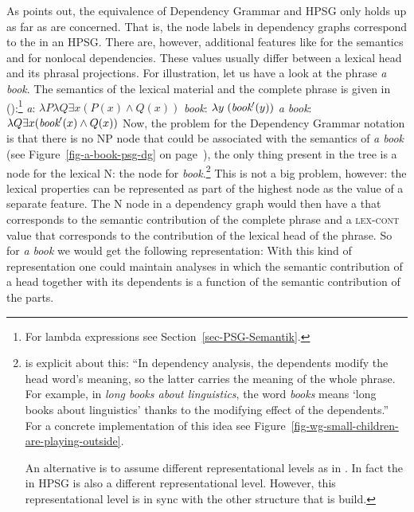 As \citet{Oliva2003a} points out, the equivalence of Dependency Grammar and HPSG only holds up as far
as \headvs are concerned.
That is, the node labels in dependency graphs correspond to the \headvs in
an HPSG. There are, however, additional features like \cont for the semantics and \slasch for
nonlocal dependencies. These values usually differ between a lexical head and its phrasal
projections. For illustration, let us have a look at the phrase \emph{a book}. The semantics of the
lexical material and the complete phrase is given in ():\footnote{%
  For lambda expressions see Section~\ref{sec-PSG-Semantik}.
}
\eal
\ex \emph{a}: $\lambda P \lambda Q \exists x (P(x) \wedge Q(x))$
\ex \emph{book}: $\lambda y\;(\textit{book}'(y))$
\ex \emph{a book}: $\lambda Q \exists x (\textit{book}'(x) \wedge Q(x))$
\zl
Now, the problem for the Dependency Grammar notation is that there is no NP node that could be
associated with the semantics of \emph{a book} (see Figure~\ref{fig-a-book-psg-dg} on page~\pageref{fig-a-book-psg-dg}), the only thing present in the tree is a node for the
lexical N: the node for \emph{book}.\footnote{%
  \citet[--392]{Hudson2003a}\indexwg is explicit about this: ``In dependency analysis, the dependents modify the head
    word's meaning, so the latter carries the meaning of the whole phrase. For example, in
    \emph{long books about linguistics}, the word \emph{books} means `long books about linguistics'
    thanks to the modifying effect of the dependents.'' For a concrete implementation of this idea
    see Figure~\vref{fig-wg-small-children-are-playing-outside}.

   An alternative is to assume different representational levels as in \mtt \citep{Melcuk81a}. In fact the \contv in
   HPSG is also a different representational level. However, this representational level is in sync
   with the other structure that is build.
} This is not a big problem, however: the lexical
properties can be represented as part of the highest node as the value of a separate feature. The N
node in a dependency graph would then have a \contv that corresponds to the semantic contribution of
the complete phrase and a \textsc{lex-cont} value that corresponds to the contribution of the lexical
head of the phrase. So for \emph{a book} we would get the following representation:
\ea
{}
\z
With this kind of representation one could maintain analyses in which the semantic contribution of a
head together with its dependents is a function of the semantic contribution of the parts. 

